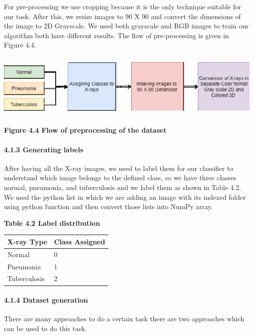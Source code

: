 \documentclass{article} %
\begin{document}
\noindent For pre-processing we use cropping because it is the only technique suitable for our task. After this, we resize images to 90 X 90 and convert the dimensions of the image to 2D Grayscale. We used both grayscale and RGB images to train our algorithm both have different results. The flow of pre-processing is given in Figure 4.4.

\noindent 

\noindent \includegraphics*[width=6.50in, height=1.27in, keepaspectratio=false]{image18}

\noindent \textbf{Figure 4.4 Flow of preprocessing of the dataset}

\noindent 
\paragraph{4.1.3 Generating labels}

\noindent After having all the X-ray images, we need to label them for our classifier to understand which image belongs to the defined class, so we have three classes normal, pneumonia, and tuberculosis and we label them as shown in Table 4.2. We used the python list in which we are adding an image with its indexed folder using python function and then convert those lists into NumPy array.

\noindent \textbf{Table 4.2 Label distribution}

\begin{tabular}{|p{0.9in}|p{1.0in}|} \hline 
\textbf{X-ray Type} & \textbf{Class Assigned} \\ \hline 
Normal & 0 \\ \hline 
Pneumonia & 1 \\ \hline 
Tuberculosis & 2 \\ \hline 
\end{tabular}



\noindent 
\paragraph{4.1.4 Dataset generation }

\noindent There are many approaches to do a certain task there are two approaches which can be used to do this task.
\end{document}
